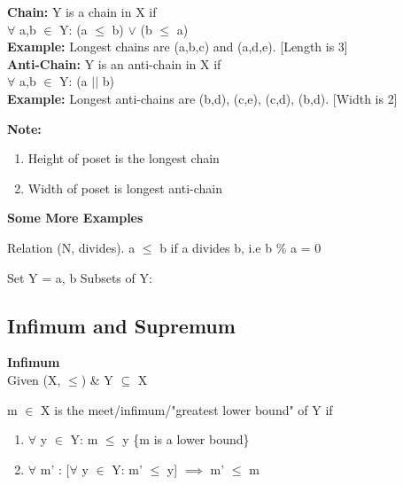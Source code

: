 \documentclass[twoside]{article}
\begin{document}
\textbf{Chain:} Y is a chain in X if \\ $\forall$ a,b $\in$ Y: (a $\leq$ b) $\lor$ (b $\leq$ a) \\
\textbf{Example:} Longest chains are (a,b,c) and (a,d,e). [Length is 3] \\

\textbf{Anti-Chain:} Y is an anti-chain in X if \\ $\forall$ a,b $\in$ Y: (a $||$ b) \\
\textbf{Example:} Longest anti-chains are (b,d), (c,e), (c,d), (b,d). [Width is 2]

\textbf{Note:}
\begin{enumerate}
\item Height of poset is the longest chain
\item Width of poset is longest anti-chain
\end{enumerate}



\begin{center}
\textbf{Some More Examples}
\end{center} 
Relation (N, divides). a $\leq$ b if a divides b, i.e b \% a = 0



Set Y = {a, b}
Subsets of Y:


\subsection*{Infimum and Supremum}

\textbf{Infimum} \\ 
Given (X, $\leq$) \& Y $\subseteq$ X

m $\in$ X is the meet/infimum/"greatest lower bound" of Y if
\begin{enumerate}
	\item $\forall$ y $\in$ Y: m $\leq$ y \{m is a lower bound\}
	\item $\forall$ m' : [$\forall$ y $\in$ Y: m' $\leq$ y] $\implies$ m' $\leq$ m
\end{enumerate}
\end{document}
